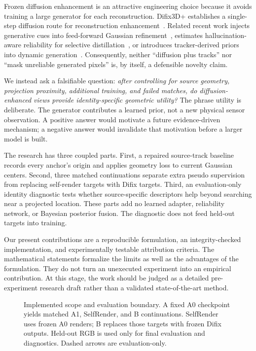 \documentclass[10pt,twocolumn,letterpaper]{article}
\begin{document}
Frozen diffusion enhancement is an attractive engineering choice because it avoids training a large generator for each reconstruction. Difix3D+ establishes a single-step diffusion route for reconstruction enhancement~\citep{wu2025difix}. Related recent work injects generative cues into feed-forward Gaussian refinement~\citep{chen2026gifsplat}, estimates hallucination-aware reliability for selective distillation~\citep{liu2026had}, or introduces tracker-derived priors into dynamic generation~\citep{sun2025track4dgen}. Consequently, neither ``diffusion plus tracks'' nor ``mask unreliable generated pixels'' is, by itself, a defensible novelty claim.

We instead ask a falsifiable question: \emph{after controlling for source geometry, projection proximity, additional training, and failed matches, do diffusion-enhanced views provide identity-specific geometric utility?} The phrase utility is deliberate. The generator contributes a learned prior, not a new physical sensor observation. A positive answer would motivate a future evidence-driven mechanism; a negative answer would invalidate that motivation before a larger model is built.

The research has three coupled parts. First, a repaired source-track baseline records every anchor's origin and applies geometry loss to current Gaussian centers. Second, three matched continuations separate extra pseudo supervision from replacing self-render targets with Difix targets. Third, an evaluation-only identity diagnostic tests whether source-specific descriptors help beyond searching near a projected location. These parts add no learned adapter, reliability network, or Bayesian posterior fusion. The diagnostic does not feed held-out targets into training.

Our present contributions are a reproducible formulation, an integrity-checked implementation, and experimentally testable attribution criteria. The mathematical statements formalize the limits as well as the advantages of the formulation. They do not turn an unexecuted experiment into an empirical contribution. At this stage, the work should be judged as a detailed pre-experiment research draft rather than a validated state-of-the-art method.

\begin{figure}[t]
\centering

\caption{Implemented scope and evaluation boundary. A fixed A0 checkpoint yields matched A1, SelfRender, and B continuations. SelfRender uses frozen A0 renders; B replaces those targets with frozen Difix outputs. Held-out RGB is used only for final evaluation and diagnostics. Dashed arrows are evaluation-only.}
\label{fig:pipeline}
\end{figure}
\end{document}
